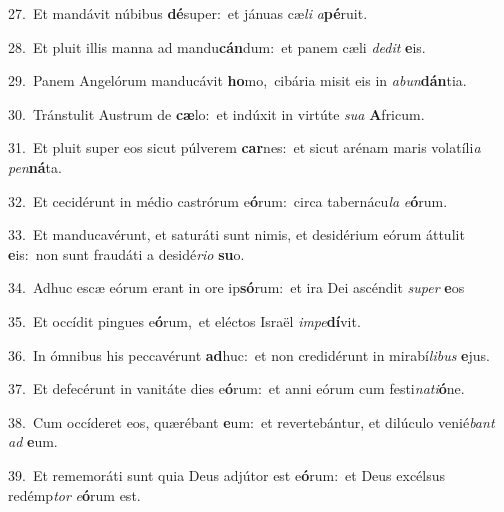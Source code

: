 {\numbfont\textcolor{\numbcolor}{27.}}~Et mandávit núbibus \textbf{dé}\-super:~\star et jánuas cæ\textit{li} \textit{a}\-\textbf{pé}ruit.\par
{\numbfont\textcolor{\numbcolor}{28.}}~Et pluit illis manna ad mandu\-\textbf{cán}\-dum:~\star et panem cæli \textit{de}\-\textit{dit} \textbf{e}\-is.\par
{\numbfont\textcolor{\numbcolor}{29.}}~Panem Angelórum manducávit \textbf{ho}\-mo,~\star cibária misit eis in \textit{ab}\-\textit{un}\textbf{dán}tia.\par
{\numbfont\textcolor{\numbcolor}{30.}}~Tránstulit Austrum de \textbf{cæ}\-lo:~\star et indúxit in virtúte \textit{su}\-\textit{a} \textbf{A}\-fricum.\par
{\numbfont\textcolor{\numbcolor}{31.}}~Et pluit super eos sicut púlverem \textbf{car}\-nes:~\star et sicut arénam maris volatíli\textit{a} \textit{pen}\-\textbf{ná}ta.\par
{\numbfont\textcolor{\numbcolor}{32.}}~Et cecidérunt in médio castrórum e\-\textbf{ó}\-rum:~\star circa tabernácu\textit{la} \textit{e}\-\textbf{ó}rum.\par
{\numbfont\textcolor{\numbcolor}{33.}}~Et manducavérunt, et saturáti sunt nimis, et desidérium eórum áttulit \textbf{e}\-is:~\star non sunt fraudáti a desidé\-\textit{ri}\-\textit{o} \textbf{su}\-o.\par
{\numbfont\textcolor{\numbcolor}{34.}}~Adhuc escæ eórum erant in ore ip\-\textbf{só}\-rum:~\star et ira Dei ascéndit \textit{su}\-\textit{per} \textbf{e}\-os\par
{\numbfont\textcolor{\numbcolor}{35.}}~Et occídit pingues e\-\textbf{ó}\-rum,~\star et eléctos Israël \textit{im}\-\textit{pe}\textbf{dí}vit.\par
{\numbfont\textcolor{\numbcolor}{36.}}~In ómnibus his peccavérunt \textbf{ad}\-huc:~\star et non credidérunt in mirabí\-\textit{li}\-\textit{bus} \textbf{e}\-jus.\par
{\numbfont\textcolor{\numbcolor}{37.}}~Et defecérunt in vanitáte dies e\-\textbf{ó}\-rum:~\star et anni eórum cum festi\-\textit{na}\-\textit{ti}\textbf{ó}ne.\par
{\numbfont\textcolor{\numbcolor}{38.}}~Cum occíderet eos, quærébant \textbf{e}\-um:~\star et revertebántur, et dilúculo venié\textit{bant} \textit{ad} \textbf{e}\-um.\par
{\numbfont\textcolor{\numbcolor}{39.}}~Et rememoráti sunt quia Deus adjútor est e\-\textbf{ó}\-rum:~\star et Deus excélsus redémp\textit{tor} \textit{e}\-\textbf{ó}rum est.\par
